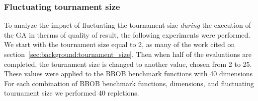 \subsubsection*{Fluctuating tournament size}

To analyze the impact of fluctuating the tournament size \textit{during} the execution of the GA in therms of quality of result, the following experiments were performed. We start with the tournament size equal to 2, as many of the work cited on section~\ref{sec:background:tournament_size}. Then when half of the evaluations are completed, the tournament size is changed to another value, chosen from 2 to 25. These values were applied to the BBOB benchmark functions with 40 dimensions For each combination of BBOB benchmark functions, dimensions, and fluctuating tournament size we performed 40 repletions.



